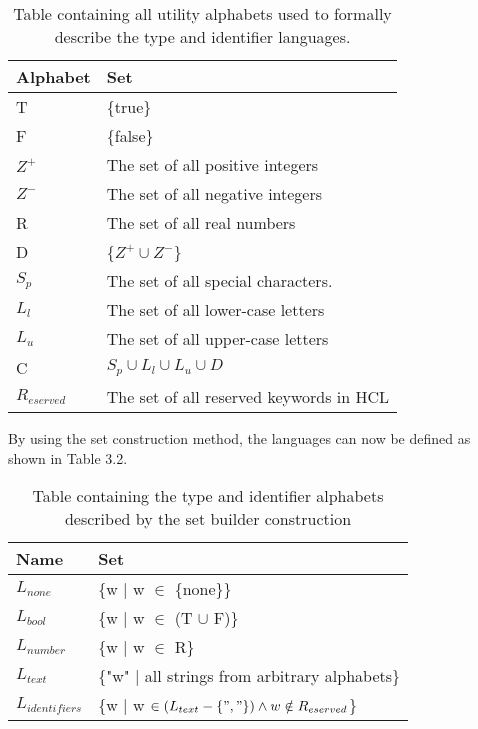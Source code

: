 \begin{table}[!htb]
	\centering
	\begin{tabular}{|l|l|}
		\hline
		\textbf{Alphabet} & \textbf{Set}                            \\ \hline
		T                 & \{true\}                                \\ \hline
		F                 & \{false\}                               \\ \hline
		$Z^+$             & The set of all positive integers        \\ \hline
		$Z^-$             & The set of all negative integers        \\ \hline
		R                 & The set of all real numbers             \\ \hline
		D                 & \{$Z^+ \cup Z^-$\}                      \\ \hline
		$S_p$             & The set of all special characters.      \\ \hline
		$L_l$             & The set of all lower-case letters       \\ \hline
		$L_u$             & The set of all upper-case letters       \\ \hline
		C                 & $S_p \cup L_l \cup L_u \cup D$          \\ \hline
		$R_{eserved}$       & The set of all reserved keywords in HCL \\ \hline
	\end{tabular}
	\caption{Table containing all utility alphabets used to formally describe the type and identifier languages.}
\end{table}

By using the set construction method, the languages can now be defined as shown in Table 3.2.

\begin{table}[!htb]
	\centering
	\label{my-label}
	\begin{tabular}{|l|l|}
		\hline
		\textbf{Name}     & \textbf{Set}                                    \\ \hline
		$L_{none}$        & \{w | w $\in$ \{none\}\}                        \\ \hline
		$L_{bool}$        & \{w | w $\in$ (T $\cup$ F)\}                    \\ \hline
		$L_{number}$      & \{w | w $\in$ R\}                               \\ \hline
		$L_{text}$        & \{"w" | all strings from arbitrary alphabets\}  \\ \hline
		$L_{identifiers}$ & \{w | w $\in (L_{text} - \{", "\}) \wedge w \notin R_{eserved}$\} \\ \hline
	\end{tabular}
	\caption{Table containing the type and identifier alphabets described by the set builder construction}
\end{table}

